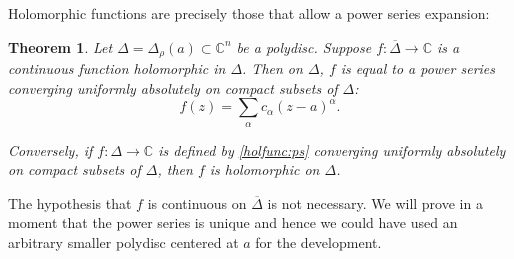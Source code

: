 \documentclass[12pt,openany]{book}
\newcommand{\C}{{\mathbb{C}}}
\theoremstyle{plain}
\newtheorem{thm}{Theorem}[section]
\theoremstyle{remark}
\theoremstyle{definition}
\theoremstyle{exercise}
\theoremstyle{example}
\begin{document}
Holomorphic functions are precisely those that allow
a power series expansion:

\begin{thm}
Let $\Delta = \Delta_\rho(a) \subset \C^n$ be a polydisc.
Suppose
$f \colon \overline{\Delta} \to \C$ is a continuous function
holomorphic in $\Delta$.
Then on $\Delta$, $f$ is equal to a power series
converging uniformly absolutely on compact subsets of $\Delta$:
\begin{equation} \label{holfunc:ps}
f(z) = \sum_{\alpha} c_\alpha {(z-a)}^\alpha .
\end{equation}

Conversely, if $f \colon \Delta \to \C$ is defined by \eqref{holfunc:ps} converging
uniformly absolutely on compact subsets of $\Delta$, then $f$ is holomorphic on
$\Delta$.
\end{thm}

The hypothesis that $f$ is continuous on $\overline{\Delta}$ is not
necessary.  We will prove in a moment that the power series is unique
and hence we could have used an arbitrary smaller polydisc centered at $a$
for the development.
\end{document}

